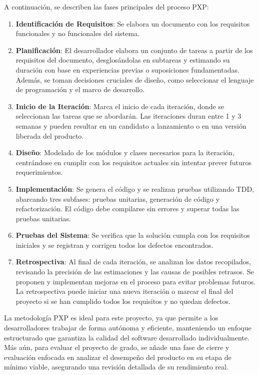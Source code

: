 \noindent
A continuación, se describen las fases principales del proceso PXP:
\begin{enumerate}[topsep=0pt, itemsep=0mm]
    \item \textbf{Identificación de Requisitos}: Se elabora un documento con los requisitos funcionales y no funcionales del sistema. 
    \item \textbf{Planificación}: El desarrollador elabora un conjunto de tareas a partir de los requisitos del documento, desglosándolas en subtareas y estimando su duración con base en experiencias previas o suposiciones fundamentadas. Además, se toman decisiones cruciales de diseño, como seleccionar el lenguaje de programación y el marco de desarrollo.
    \item \textbf{Inicio de la Iteración}: Marca el inicio de cada iteración, donde se seleccionan las tareas que se abordarán. Las iteraciones duran entre 1 y 3 semanas y pueden resultar en un candidato a lanzamiento o en una versión liberada del producto.
    \item \textbf{Diseño}: Modelado de los módulos y clases necesarios para la iteración, centrándose en cumplir con los requisitos actuales sin intentar prever futuros requerimientos. 
    \item \textbf{Implementación}: Se genera el código y se realizan pruebas utilizando TDD, abarcando tres subfases: pruebas unitarias, generación de código y refactorización. El código debe compilarse sin errores y superar todas las pruebas unitarias.
    \item \textbf{Pruebas del Sistema}: Se verifica que la solución cumpla con los requisitos iniciales y se registran y corrigen todos los defectos encontrados.
    \item \textbf{Retrospectiva}: Al final de cada iteración, se analizan los datos recopilados, revisando la precisión de las estimaciones y las causas de posibles retrasos. Se proponen y implementan mejoras en el proceso para evitar problemas futuros. La retrospectiva puede iniciar una nueva iteración o marcar el final del proyecto si se han cumplido todos los requisitos y no quedan defectos.
\end{enumerate}

La metodología PXP es ideal para este proyecto, ya que permite a los desarrolladores trabajar de forma autónoma y eficiente, manteniendo un enfoque estructurado que garantiza la calidad del software desarrollado individualmente. Más aún, para evaluar el proyecto de grado, se añade una fase de cierre y evaluación enfocada en analizar el desempeño del producto en su etapa de mínimo viable, asegurando una revisión detallada de su rendimiento real.

